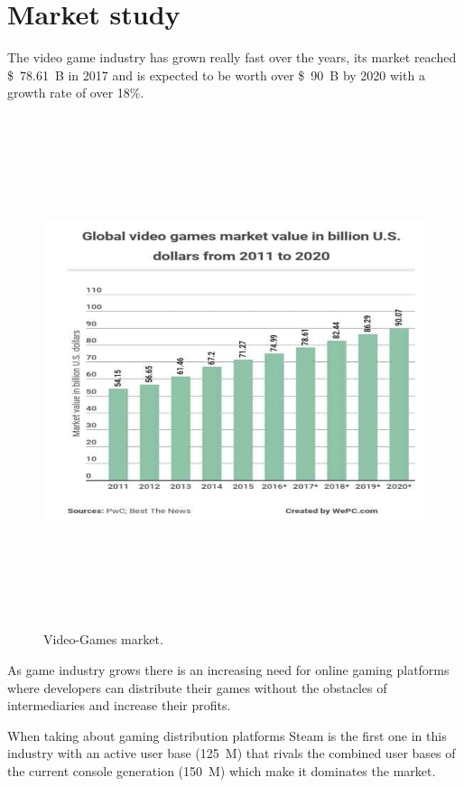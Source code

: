 \documentclass[fontsize=14pt,svgnames]{scrreprt}
\begin{document}
\section{Market study}
The video game industry has grown really fast over the years, its market reached \SI{78.61}[\$]{B} in 2017 and is expected to be worth over \SI{90}[\$]{B} by 2020 with a growth rate of over 18\%.
\begin{figure}[H]
\centering
  \includegraphics[width=\linewidth,height=15cm]{Diagrams/video-games-market-value.png}
    \caption{\small{Video-Games market.\protect\footnotemark}}
  \label{fig:1}
\end{figure}
\par As game industry grows there is an increasing need for online gaming platforms
where developers can distribute their games without the obstacles of intermediaries and increase their profits.
\par When taking about gaming distribution platforms Steam is the first one in this industry with an active user base (\SI{125}[]{M}) that rivals the combined user bases of the current console generation (\SI{150}[]{M}) which make it dominates the market.
\end{document}
